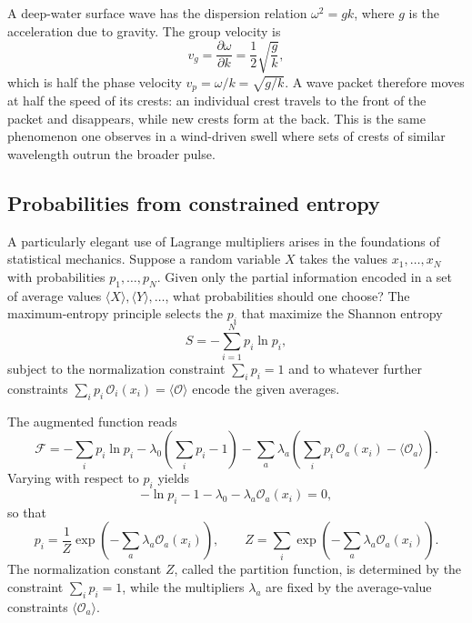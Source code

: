\begin{example}
A deep-water surface wave has the dispersion relation $\omega^2=gk$, where $g$ is the acceleration due to gravity. The group velocity is
\begin{equation}
v_g=\frac{\partial\omega}{\partial k}=\frac12\sqrt{\frac{g}{k}},
\end{equation}
which is half the phase velocity $v_p=\omega/k=\sqrt{g/k}$. A wave packet therefore moves at half the speed of its crests: an individual crest travels to the front of the packet and disappears, while new crests form at the back. This is the same phenomenon one observes in a wind-driven swell where sets of crests of similar wavelength outrun the broader pulse.
\end{example}

\subsection{Probabilities from constrained entropy}

A particularly elegant use of Lagrange multipliers arises in the foundations of statistical mechanics. Suppose a random variable $X$ takes the values $x_1,\ldots,x_N$ with probabilities $p_1,\ldots,p_N$. Given only the partial information encoded in a set of average values $\langle X\rangle,\langle Y\rangle,\ldots$, what probabilities should one choose? The maximum-entropy principle selects the $p_i$ that maximize the Shannon entropy
\begin{equation}
S=-\sum_{i=1}^N p_i\ln p_i,
\end{equation}
subject to the normalization constraint $\sum_i p_i=1$ and to whatever further constraints $\sum_i p_i\,\mathcal O_i(x_i)=\langle\mathcal O\rangle$ encode the given averages.

The augmented function reads
\begin{equation}
\mathcal F=-\sum_i p_i\ln p_i-\lambda_0\!\left(\sum_i p_i-1\right)-\sum_a\lambda_a\!\left(\sum_i p_i\,\mathcal O_a(x_i)-\langle\mathcal O_a\rangle\right).
\end{equation}
Varying with respect to $p_i$ yields
\begin{equation}
-\ln p_i-1-\lambda_0-\lambda_a\mathcal O_a(x_i)=0,
\end{equation}
so that
\begin{equation}
p_i=\frac{1}{Z}\exp\!\left(-\sum_a\lambda_a\mathcal O_a(x_i)\right),
\qquad
Z=\sum_i\exp\!\left(-\sum_a\lambda_a\mathcal O_a(x_i)\right).
\end{equation}
The normalization constant $Z$, called the partition function, is determined by the constraint $\sum_i p_i=1$, while the multipliers $\lambda_a$ are fixed by the average-value constraints $\langle\mathcal O_a\rangle$.

